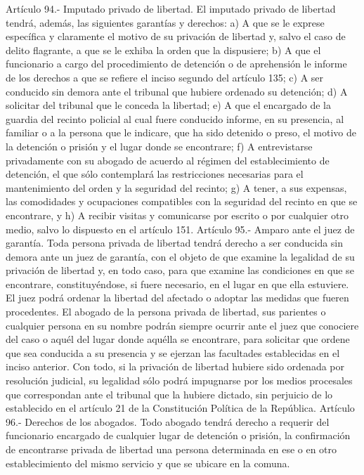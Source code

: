     Artículo 94.- Imputado privado de libertad. El imputado privado de libertad tendrá, además, las siguientes garantías y derechos:
    a) A que se le exprese específica y claramente el motivo de su privación de libertad y, salvo el caso de delito flagrante, a que se le exhiba la orden que la dispusiere;
    b) A que el funcionario a cargo del procedimiento de detención o de aprehensión le informe de los derechos a que se refiere el inciso segundo del artículo 135;
    c) A ser conducido sin demora ante el tribunal que hubiere ordenado su detención;
    d) A solicitar del tribunal que le conceda la libertad;
    e) A que el encargado de la guardia del recinto policial al cual fuere conducido informe, en su presencia, al familiar o a la persona que le indicare, que ha sido detenido o preso, el motivo de la detención o prisión y el lugar donde se encontrare;
    f) A entrevistarse privadamente con su abogado de acuerdo al régimen del establecimiento de detención, el que sólo contemplará las restricciones necesarias para el mantenimiento del orden y la seguridad del recinto;
    g) A tener, a sus expensas, las comodidades y ocupaciones compatibles con la seguridad del recinto en que se encontrare, y
    h) A recibir visitas y comunicarse por escrito o por cualquier otro medio, salvo lo dispuesto en el artículo 151.
    Artículo 95.- Amparo ante el juez de garantía. Toda persona privada de libertad tendrá derecho a ser conducida sin demora ante un juez de garantía, con el objeto de que examine la legalidad de su privación de libertad y, en todo caso, para que examine las condiciones en que se encontrare, constituyéndose, si fuere necesario, en el lugar en que ella estuviere. El juez podrá ordenar la libertad del afectado o adoptar las medidas que fueren procedentes.
    El abogado de la persona privada de libertad, sus parientes o cualquier persona en su nombre podrán siempre ocurrir ante el juez que conociere del caso o aquél del lugar donde aquélla se encontrare, para solicitar que ordene que sea conducida a su presencia y se ejerzan las facultades establecidas en el inciso anterior.
    Con todo, si la privación de libertad hubiere sido ordenada por resolución judicial, su legalidad sólo podrá impugnarse por los medios procesales que correspondan ante el tribunal que la hubiere dictado, sin perjuicio de lo establecido en el artículo 21 de la Constitución Política de la República.
    Artículo 96.- Derechos de los abogados. Todo abogado tendrá derecho a requerir del funcionario encargado de cualquier lugar de detención o prisión, la confirmación de encontrarse privada de libertad una persona determinada en ese o en otro establecimiento del mismo servicio y que se ubicare en la comuna.
